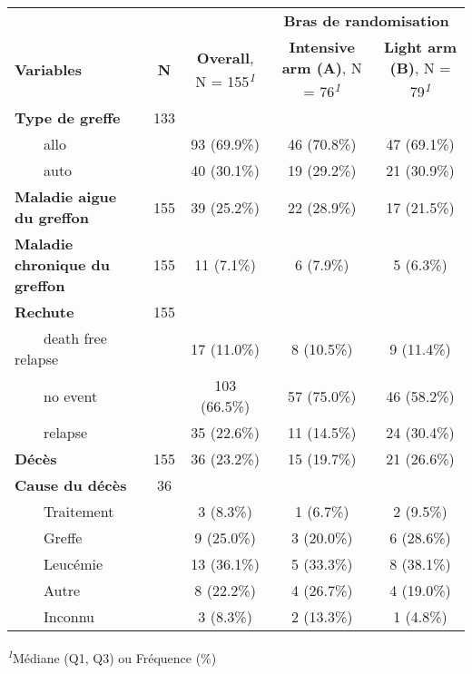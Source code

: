 \setlength{\LTpost}{0mm}
\begin{longtable}{lcccc}
\toprule
 &  &  & \multicolumn{2}{c}{\textbf{Bras de randomisation}} \\ 
\cmidrule(lr){4-5}
\textbf{Variables} & \textbf{N} & \textbf{Overall}, N = 155\textsuperscript{\textit{1}} & \textbf{Intensive arm (A)}, N = 76\textsuperscript{\textit{1}} & \textbf{Light arm (B)}, N = 79\textsuperscript{\textit{1}} \\ 
\midrule\addlinespace[2.5pt]
\textbf{Type de greffe} & 133 &  &  &  \\ 
    allo &  & 93 (69.9\%) & 46 (70.8\%) & 47 (69.1\%) \\ 
    auto &  & 40 (30.1\%) & 19 (29.2\%) & 21 (30.9\%) \\ 
\textbf{Maladie aigue du greffon} & 155 & 39 (25.2\%) & 22 (28.9\%) & 17 (21.5\%) \\ 
\textbf{Maladie chronique du greffon} & 155 & 11 (7.1\%) & 6 (7.9\%) & 5 (6.3\%) \\ 
\textbf{Rechute} & 155 &  &  &  \\ 
    death free relapse &  & 17 (11.0\%) & 8 (10.5\%) & 9 (11.4\%) \\ 
    no event &  & 103 (66.5\%) & 57 (75.0\%) & 46 (58.2\%) \\ 
    relapse &  & 35 (22.6\%) & 11 (14.5\%) & 24 (30.4\%) \\ 
\textbf{Décès} & 155 & 36 (23.2\%) & 15 (19.7\%) & 21 (26.6\%) \\ 
\textbf{Cause du décès} & 36 &  &  &  \\ 
    Traitement &  & 3 (8.3\%) & 1 (6.7\%) & 2 (9.5\%) \\ 
    Greffe &  & 9 (25.0\%) & 3 (20.0\%) & 6 (28.6\%) \\ 
    Leucémie &  & 13 (36.1\%) & 5 (33.3\%) & 8 (38.1\%) \\ 
    Autre &  & 8 (22.2\%) & 4 (26.7\%) & 4 (19.0\%) \\ 
    Inconnu &  & 3 (8.3\%) & 2 (13.3\%) & 1 (4.8\%) \\ 
\bottomrule
\end{longtable}
\begin{minipage}{\linewidth}
\textsuperscript{\textit{1}}Médiane (Q1, Q3) ou Fréquence (\%)\\
\end{minipage}

